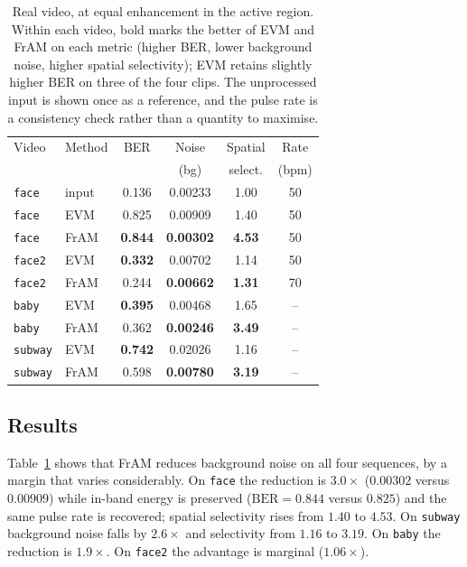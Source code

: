 \documentclass[conference]{IEEEtran}
\begin{document}
\begin{table}[t]
\caption{Real video, at equal enhancement in the active region. Within each
video, bold marks the better of EVM and FrAM on each metric (higher BER, lower
background noise, higher spatial selectivity); EVM retains slightly higher BER
on three of the four clips. The unprocessed input is shown once as a
reference, and the pulse rate is a consistency check rather than a quantity to
maximise.}
\label{tab:real}
\centering
\begin{tabular}{llcccc}
\toprule
Video & Method & BER & Noise & Spatial & Rate \\
      &        &     & (bg)  & select. & (bpm) \\
\midrule
\texttt{face} & input & 0.136 & 0.00233 & 1.00 & 50 \\
\texttt{face} & EVM   & 0.825 & 0.00909 & 1.40 & 50 \\
\texttt{face} & FrAM  & \textbf{0.844} & \textbf{0.00302} & \textbf{4.53} & 50 \\
\midrule
\texttt{face2} & EVM  & \textbf{0.332} & 0.00702 & 1.14 & 50 \\
\texttt{face2} & FrAM & 0.244 & \textbf{0.00662} & \textbf{1.31} & 70 \\
\midrule
\texttt{baby} & EVM   & \textbf{0.395} & 0.00468 & 1.65 & -- \\
\texttt{baby} & FrAM  & 0.362 & \textbf{0.00246} & \textbf{3.49} & -- \\
\midrule
\texttt{subway} & EVM  & \textbf{0.742} & 0.02026 & 1.16 & -- \\
\texttt{subway} & FrAM & 0.598 & \textbf{0.00780} & \textbf{3.19} & -- \\
\bottomrule
\end{tabular}
\end{table}

\subsection{Results}

Table~\ref{tab:real} shows that FrAM reduces background noise on all four
sequences, by a margin that varies considerably. On \texttt{face} the reduction
is $3.0\times$ ($0.00302$ versus $0.00909$) while in-band energy is preserved
($\text{BER} = 0.844$ versus $0.825$) and the same pulse rate is recovered;
spatial selectivity rises from $1.40$ to $4.53$. On \texttt{subway} background
noise falls by $2.6\times$ and selectivity from $1.16$ to $3.19$. On
\texttt{baby} the reduction is $1.9\times$. On \texttt{face2} the advantage is
marginal ($1.06\times$).
\end{document}
